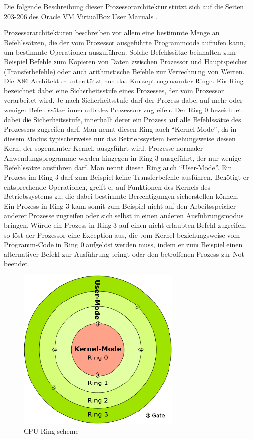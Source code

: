 Die folgende Beschreibung dieser Prozessorarchitektur stützt sich auf die Seiten 203-206 des Oracle VM VirtualBox User Manuals \citep{Oracle14}.

Prozessorarchitekturen beschreiben vor allem eine bestimmte Menge an Befehlssätzen, die der vom Prozessor ausgeführte Programmcode aufrufen kann, um bestimmte Operationen auszuführen. Solche Befehlssätze beinhalten zum Beispiel Befehle zum Kopieren von Daten zwischen Prozessor und Hauptspeicher (Transferbefehle) oder auch arithmetische Befehle zur Verrechnung von Werten. Die X86-Architektur unterstützt nun das Konzept sogenannter Ringe. Ein Ring bezeichnet dabei eine Sicherheitsstufe eines Prozesses, der vom Prozessor verarbeitet wird. Je nach Sicherheitsstufe darf der Prozess dabei auf mehr oder weniger Befehlssätze innerhalb des Prozessors zugreifen. Der Ring 0 bezeichnet dabei die Sicherheitsstufe, innerhalb derer ein Prozess auf alle Befehlssätze des Prozessors zugreifen darf. Man nennt diesen Ring auch "`Kernel-Mode"', da in diesem Modus typischerweise nur das Betriebssystem beziehungsweise dessen Kern, der sogenannter Kernel, ausgeführt wird. Prozesse normaler Anwendungsprogramme werden hingegen in Ring 3 ausgeführt, der nur wenige Befehlssätze ausführen darf. Man nennt diesen Ring auch "`User-Mode"'. Ein Prozess im Ring 3 darf zum Beispiel keine Transferbefehle ausführen. Benötigt er entsprechende Operationen, greift er auf Funktionen des Kernels des Betriebssystems zu, die dabei bestimmte Berechtigungen sicherstellen können. Ein Prozess in Ring 3 kann somit zum Beispiel nicht auf den Arbeitsspeicher anderer Prozesse zugreifen oder sich selbst in einen anderen Ausführungsmodus bringen. Würde ein Prozess in Ring 3 auf einen nicht erlaubten Befehl zugreifen, so löst der Prozessor eine Exception aus, die vom Kernel beziehungsweise vom Programm-Code in Ring 0 aufgelöst werden muss, indem er zum Beispiel einen alternativer Befehl zur Ausführung bringt oder den betroffenen Prozess zur Not beendet.

\begin{figure}[!ht]
  \begin{center}
    \includegraphics[width=8cm]{bilder/500px-CPU_ring_scheme.png}
    \caption{CPU Ring scheme \citep{wiki:006}}
  \end{center}
\end{figure}

